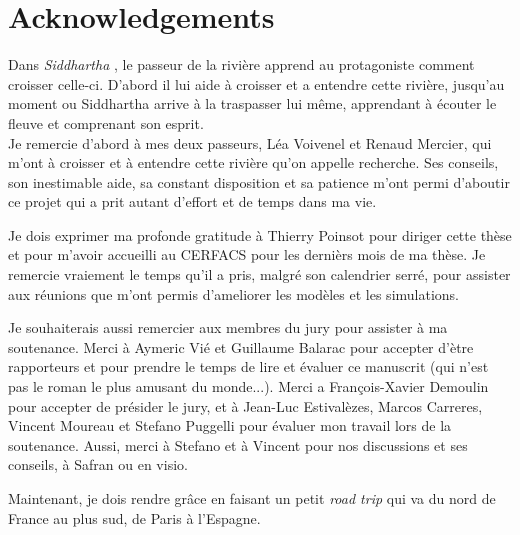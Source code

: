 \chapter*{Acknowledgements}
    
Dans \textsl{Siddhartha} , le passeur de la rivière apprend au protagoniste comment croisser celle-ci. D'abord il lui aide à croisser et a entendre cette rivière, jusqu'au moment ou Siddhartha arrive à la traspasser lui même, apprendant à écouter le fleuve et comprenant son esprit. \\  %
%
Je remercie d'abord à mes deux passeurs, Léa Voivenel et Renaud Mercier, qui m'ont  à croisser et à entendre cette rivière qu'on appelle recherche. Ses conseils, son inestimable aide, sa constant disposition et sa patience m'ont permi d'aboutir ce projet qui a prit autant d'effort et de temps dans ma vie.

Je dois exprimer ma profonde gratitude à Thierry Poinsot pour diriger cette thèse et pour m'avoir accueilli au CERFACS pour les dernièrs mois de ma thèse. Je remercie vraiement le temps qu'il a pris, malgré son calendrier serré, pour assister aux réunions que m'ont permis d'ameliorer les modèles et les simulations.

Je souhaiterais aussi remercier aux membres du jury pour assister à ma soutenance. Merci à Aymeric Vié et Guillaume Balarac pour accepter d'ètre rapporteurs et pour prendre le temps de lire et évaluer ce manuscrit (qui n'est pas le roman le plus amusant du monde...).  Merci a François-Xavier Demoulin pour accepter de présider le jury, et à Jean-Luc Estivalèzes, Marcos Carreres, Vincent Moureau et Stefano Puggelli pour évaluer mon travail lors de la soutenance. Aussi, merci à Stefano et à Vincent pour nos discussions et ses conseils, à Safran ou en visio. 

Maintenant, je dois rendre grâce en faisant un petit \textsl{road trip} qui va du nord de France au plus sud, de Paris à l'Espagne. 

